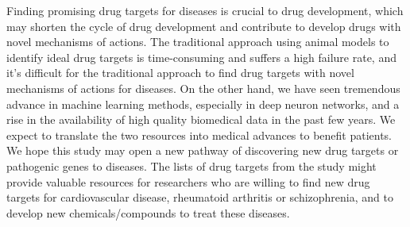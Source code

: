   Finding promising drug targets for diseases is crucial to drug development, which may shorten the cycle of drug development and contribute to develop drugs with novel mechanisms of actions. The traditional approach using animal models to identify ideal drug targets is time-consuming and suffers a high failure rate, and it's difficult for the traditional approach to find drug targets with novel mechanisms of actions for diseases. On the other hand, we have seen tremendous advance in machine learning methods, especially in deep neuron networks, and a rise in the availability of high quality biomedical data in the past few years. We expect to translate the two resources into medical advances to benefit patients. We hope this study may open a new pathway of discovering new drug targets or pathogenic genes to diseases. The lists of drug targets from the study might provide valuable resources for researchers who are willing to find new drug targets for cardiovascular disease, rheumatoid arthritis or schizophrenia, and to develop new chemicals/compounds to treat these diseases.

\chapterend